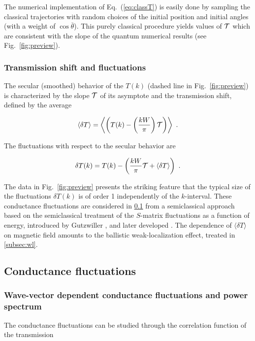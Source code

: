 \documentclass[a4paper,10pt]{article}
\newcommand{\nin}{\noindent}
\def\btheta{\bar {\theta}}
\newcommand{\be}{\begin{equation}}
\newcommand{\ee}{\end{equation}}
\newcommand{\dlT}{\delta T}
\begin{document}
\nin The numerical implementation of Eq.~(\ref{eq:classT}) is easily done by sampling the classical trajectories with random choices of the
initial position and initial angles (with a weight of 
$\cos{\btheta}$). This purely classical procedure yields values of ${\cal T}$ which are
consistent with the slope of the quantum numerical results (see Fig.~\ref{fig:preview}).

\subsubsection{Transmission shift and fluctuations}
\label{subsubsec:tsaf}

The secular (smoothed) behavior of the $T(k)$ (dashed line in Fig.~\ref{fig:preview}) is characterized by the slope ${\cal T}$ of its asymptote  and the transmission shift, defined by the average

\be
\langle \dlT \rangle = \left\langle \left(T(k) - \left(\frac{kW}{\pi}\right) 
{\cal T} \right) \right\rangle \ .
\label{eq:kappa}
\ee

\nin The fluctuations with respect to the secular behavior are 

\be
\delta T(k) =  T(k) - \left(\frac{kW}{\pi} {\cal T} + \langle \dlT \rangle \right)  \ .
\label{eq:dlTdef}
\ee

\nin The data in Fig.~\ref{fig:preview} presents the striking feature that the typical size of the fluctuations $\delta T(k)$ is of order 1 independently of the $k$-interval. These conductance fluctuations are considered in \ref{subsec:cf} from a semiclassical approach \cite{Jal90} based on the semiclassical treatment of the $S$-matrix fluctuations 
as a function of energy, introduced by Gutzwiller \cite{Gutz83}, and later developed \cite{Blu88,Gas89}. The dependence of $\langle \dlT \rangle$ on magnetic field amounts to the ballistic weak-localization effect, treated in \ref{subsec:wl}. 

\subsection{Conductance fluctuations}
\label{subsec:cf}

\subsubsection{Wave-vector dependent conductance fluctuations and power spectrum}

The conductance fluctuations can be studied through the correlation function of the transmission 
\end{document}
